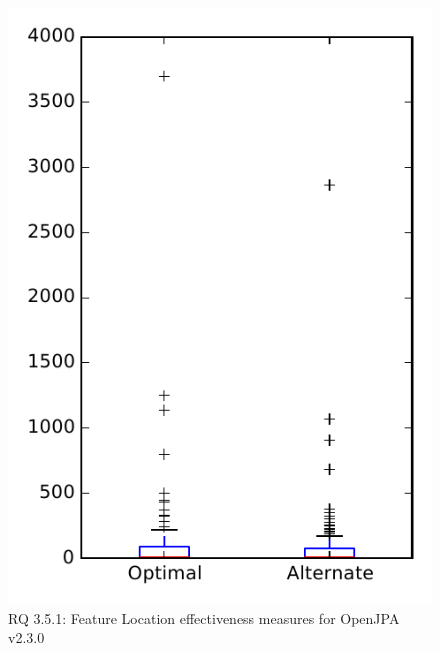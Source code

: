 
\begin{figure}
\centering
\includegraphics[height=0.4\textheight]{figures/combo/flt_rq1_openjpa}
\caption{RQ 3.5.1: Feature Location effectiveness measures for OpenJPA v2.3.0}
\label{fig:flt:rq1:openjpa}
\end{figure}
